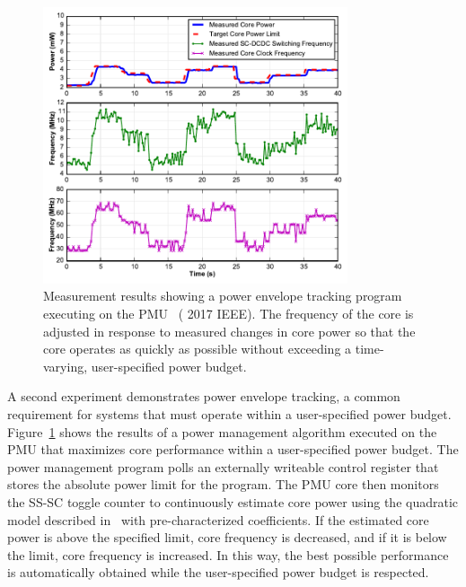 \documentclass[graybox]{svmult}
\begin{document}
\begin{figure}
  \centering
  \includegraphics[width=0.8\textwidth]{6-raven4-power-tracking}
  \caption{Measurement results showing a power envelope tracking program executing on the PMU~\cite{Keller2017} ({\textcopyright} 2017 IEEE). The frequency of the core is adjusted in response to measured changes in core power so that the core operates as quickly as possible without exceeding a time-varying, user-specified power budget.}
  \label{fig:6-raven4-power-tracking}
\end{figure}

A second experiment demonstrates power envelope tracking, a common requirement for systems that must operate within a user-specified power budget.
Figure~\ref{fig:6-raven4-power-tracking} shows the results of a power management algorithm executed on the PMU that maximizes core performance within a user-specified power budget.
The power management program polls an externally writeable control register that stores the absolute power limit for the program.
The PMU core then monitors the SS-SC toggle counter to continuously estimate core power using the quadratic model described in~\cite{Cochet2016} with pre-characterized coefficients.
If the estimated core power is above the specified limit, core frequency is decreased, and if it is below the limit, core frequency is increased.
In this way, the best possible performance is automatically obtained while the user-specified power budget is respected.
\end{document}
